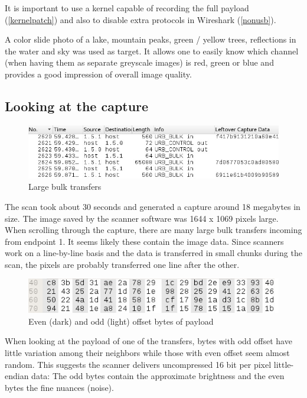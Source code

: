 \documentclass{article}
\begin{document}
It is important to use a kernel capable of recording the full payload (\autoref{kernelpatch})
and also to disable extra protocols in Wireshark (\autoref{nonusb}).

A color slide photo of a lake, mountain peaks, green / yellow trees,
reflections in the water and sky was used as target.
It allows one to easily know which channel (when having them as separate greyscale images)
is red, green or blue and provides a good impression of overall image quality.

\subsection{Looking at the capture}

\begin{figure}[H]
  \caption{Large bulk transfers}
  \centering
  \includegraphics[width=\textwidth]{images/extract_sniff1.jpg}
\end{figure}

The scan took about 30 seconds and generated a capture around 18 megabytes
in size. The image saved by the scanner software was 1644 x 1069 pixels large.
When scrolling through the capture, there are many large bulk transfers
incoming from endpoint 1. It seems likely these contain the image data.
Since scanners work on a line-by-line basis and the data is transferred
in small chunks during the scan, the pixels are probably transferred
one line after the other.

\begin{figure}[H]
  \caption{Even (dark) and odd (light) offset bytes of payload}
  \centering
  \includegraphics[width=\textwidth]{images/extract_sniff2.jpg}
\end{figure}

\label{capture_highlowbytes}

When looking at the payload of one of the transfers, bytes with odd offset
have little variation among their neighbors while those with even offset
seem almost random. This suggests the scanner delivers uncompressed
16 bit per pixel little-endian data:
The odd bytes contain the approximate brightness and
the even bytes the fine nuances (noise).
\end{document}
